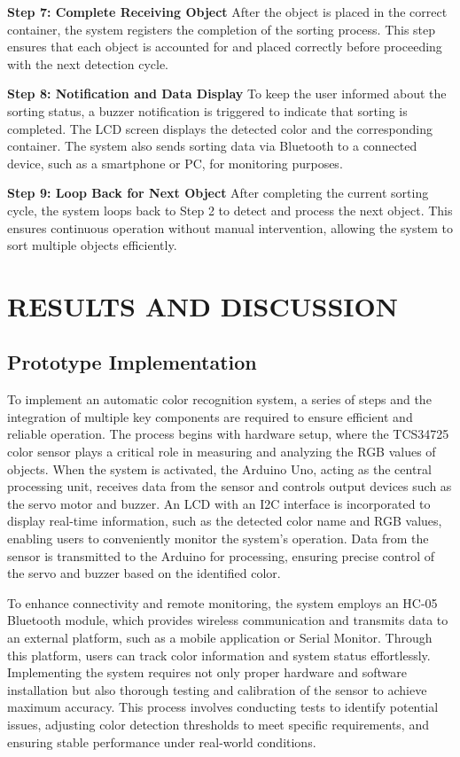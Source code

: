 \documentclass[conference, onecolumn]{IEEEtran}
\begin{document}
\textbf{Step 7: Complete Receiving Object}
After the object is placed in the correct container, the system registers the completion of the sorting process. This step ensures that each object is accounted for and placed correctly before proceeding with the next detection cycle.
\vspace{0.5cm}
\noindent

\textbf{Step 8: Notification and Data Display}
To keep the user informed about the sorting status, a buzzer notification is triggered to indicate that sorting is completed. The LCD screen displays the detected color and the corresponding container. The system also sends sorting data via Bluetooth to a connected device, such as a smartphone or PC, for monitoring purposes.
\vspace{0.5cm}
\noindent

\textbf{Step 9: Loop Back for Next Object}
After completing the current sorting cycle, the system loops back to Step 2 to detect and process the next object. This ensures continuous operation without manual intervention, allowing the system to sort multiple objects efficiently.
\noindent

\vspace{2cm}
\section{RESULTS AND DISCUSSION}
\subsection{\textbf{Prototype Implementation}}
To implement an automatic color recognition system, a series of steps and the integration of multiple key components are required to ensure efficient and reliable operation. The process begins with hardware setup, where the TCS34725 color sensor plays a critical role in measuring and analyzing the RGB values of objects. When the system is activated, the Arduino Uno, acting as the central processing unit, receives data from the sensor and controls output devices such as the servo motor and buzzer. An LCD with an I2C interface is incorporated to display real-time information, such as the detected color name and RGB values, enabling users to conveniently monitor the system’s operation. Data from the sensor is transmitted to the Arduino for processing, ensuring precise control of the servo and buzzer based on the identified color.

To enhance connectivity and remote monitoring, the system employs an HC-05 Bluetooth module, which provides wireless communication and transmits data to an external platform, such as a mobile application or Serial Monitor. Through this platform, users can track color information and system status effortlessly. Implementing the system requires not only proper hardware and software installation but also thorough testing and calibration of the sensor to achieve maximum accuracy. This process involves conducting tests to identify potential issues, adjusting color detection thresholds to meet specific requirements, and ensuring stable performance under real-world conditions.
\end{document}
